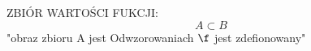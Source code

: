 \documentclass{article}
\begin{document}
ZBIÓR WARTOŚCI FUKCJI:
    \[A \subset B\]
    "obraz zbioru A jest Odwzorowaniach $\f$ jest zdefionowany"
\end{document}
